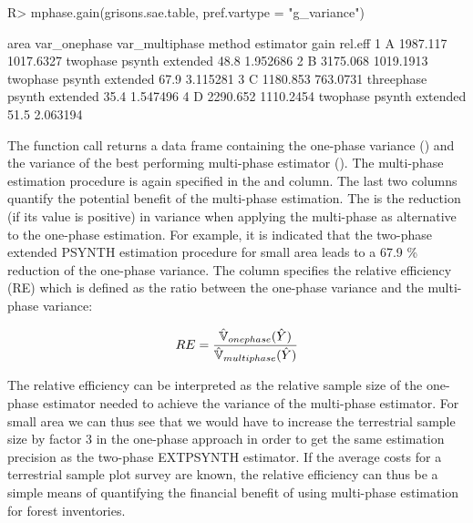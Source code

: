 \begin{small}
\begin{Schunk}
\begin{Sinput}
R> mphase.gain(grisons.sae.table, pref.vartype = "g_variance")
\end{Sinput}
\begin{Soutput}
  area var_onephase var_multiphase     method       estimator gain  rel.eff
1    A     1987.117      1017.6327   twophase psynth extended 48.8 1.952686
2    B     3175.068      1019.1913   twophase psynth extended 67.9 3.115281
3    C     1180.853       763.0731 threephase psynth extended 35.4 1.547496
4    D     2290.652      1110.2454   twophase psynth extended 51.5 2.063194
\end{Soutput}
\end{Schunk}
\end{small}

The function call returns a data frame containing the one-phase variance () and the variance of the best performing multi-phase estimator (). The multi-phase estimation procedure is again specified in the  and  column. The last two columns quantify the potential benefit of the multi-phase estimation. The  is the reduction (if its value is positive) in variance when applying the multi-phase as alternative to the one-phase estimation. For example, it is indicated that the two-phase extended PSYNTH estimation procedure for small area  leads to a 67.9 \% reduction of the one-phase variance. The column  specifies the relative efficiency (RE) which is defined as the ratio between the one-phase variance and the multi-phase variance:

\begin{equation}\label{eq:releff}
  RE=\frac{\hat{\mathbb{V}}_{onephase}(\hat{Y})}{\hat{\mathbb{V}}_{multiphase}(\hat{Y})}
  \end{equation}

The relative efficiency can be interpreted as the relative sample size of the one-phase estimator needed to achieve the variance of the multi-phase estimator. For small area  we can thus see that we would have to increase the terrestrial sample size by factor 3 in the one-phase approach in order to get the same estimation precision as the two-phase EXTPSYNTH estimator. If the average costs for a terrestrial sample plot survey are known, the relative efficiency can thus be a simple means of quantifying the financial benefit of using multi-phase estimation for forest inventories.



